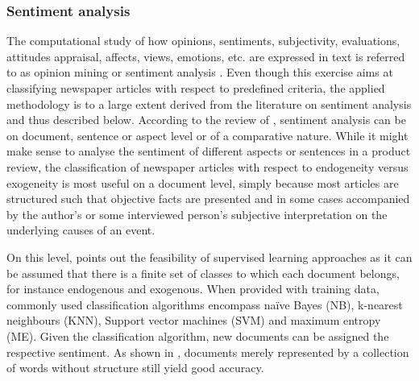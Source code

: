 %
\subsubsection{Sentiment analysis}

The computational study of how opinions, sentiments, subjectivity, evaluations, attitudes appraisal, affects, views, emotions, etc. are expressed in text is referred to as opinion mining or sentiment analysis \parencite{Liu.2012}. Even though this exercise aims at classifying newspaper articles with respect to predefined criteria, the applied methodology is to a large extent derived from the literature on sentiment analysis and thus described below. According to the review of \textcite{Feldman.2013}, sentiment analysis can be on document, sentence or aspect level or of a comparative nature. While it might make sense to analyse the sentiment of different aspects or sentences in a product review, the classification of newspaper articles with respect to endogeneity versus exogeneity is most useful on a document level, simply because most articles are structured such that objective facts are presented and in some cases accompanied by the author's or some interviewed person's subjective interpretation on the underlying causes of an event. 

On this level, \textcite{Feldman.2013} points out the feasibility of supervised learning approaches as it can be assumed that there is a finite set of classes to which each document belongs, for instance endogenous and exogenous. When provided with training data, commonly used classification algorithms encompass na\"{i}ve Bayes (NB), k-nearest neighbours (KNN), Support vector machines (SVM) and maximum entropy (ME). Given the classification algorithm, new documents can be assigned the respective sentiment. As shown in \textcite{Pang.2002}, documents merely represented by a collection of words without structure still yield good accuracy. 

